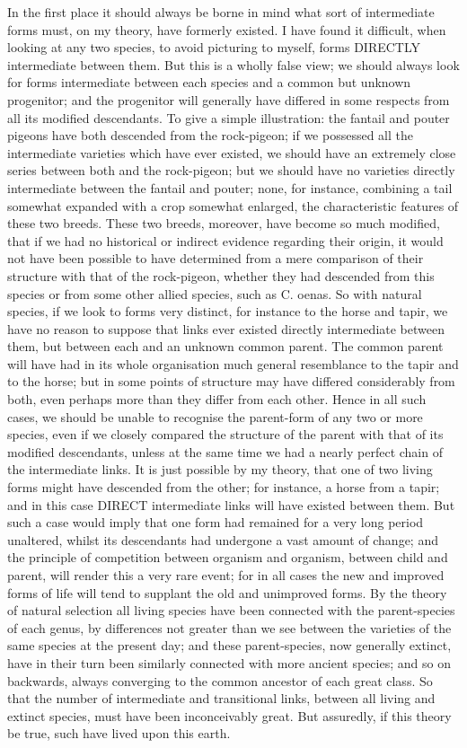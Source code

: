 In the first place it should always be borne in mind what sort of intermediate forms must, on my theory, have formerly existed. I have found it difficult, when looking at any two species, to avoid picturing to myself, forms DIRECTLY intermediate between them. But this is a wholly false view; we should always look for forms intermediate between each species and a common but unknown progenitor; and the progenitor will generally have differed in some respects from all its modified descendants. To give a simple illustration: the fantail and pouter pigeons have both descended from the rock-pigeon; if we possessed all the intermediate varieties which have ever existed, we should have an extremely close series between both and the rock-pigeon; but we should have no varieties directly intermediate between the fantail and pouter; none, for instance, combining a tail somewhat expanded with a crop somewhat enlarged, the characteristic features of these two breeds. These two breeds, moreover, have become so much modified, that if we had no historical or indirect evidence regarding their origin, it would not have been possible to have determined from a mere comparison of their structure with that of the rock-pigeon, whether they had descended from this species or from some other allied species, such as C. oenas.
So with natural species, if we look to forms very distinct, for instance to the horse and tapir, we have no reason to suppose that links ever existed directly intermediate between them, but between each and an unknown common parent. The common parent will have had in its whole organisation much general resemblance to the tapir and to the horse; but in some points of structure may have differed considerably from both, even perhaps more than they differ from each other. Hence in all such cases, we should be unable to recognise the parent-form of any two or more species, even if we closely compared the structure of the parent with that of its modified descendants, unless at the same time we had a nearly perfect chain of the intermediate links.
It is just possible by my theory, that one of two living forms might have descended from the other; for instance, a horse from a tapir; and in this case DIRECT intermediate links will have existed between them. But such a case would imply that one form had remained for a very long period unaltered, whilst its descendants had undergone a vast amount of change; and the principle of competition between organism and organism, between child and parent, will render this a very rare event; for in all cases the new and improved forms of life will tend to supplant the old and unimproved forms.
By the theory of natural selection all living species have been connected with the parent-species of each genus, by differences not greater than we see between the varieties of the same species at the present day; and these parent-species, now generally extinct, have in their turn been similarly connected with more ancient species; and so on backwards, always converging to the common ancestor of each great class. So that the number of intermediate and transitional links, between all living and extinct species, must have been inconceivably great. But assuredly, if this theory be true, such have lived upon this earth.

